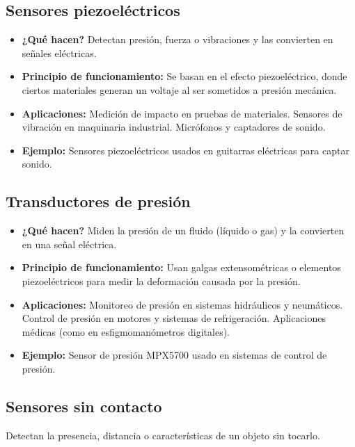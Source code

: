 \subsection*{Sensores piezoeléctricos}
\begin{itemize}
	\item \textbf{¿Qué hacen?} Detectan presión, fuerza o vibraciones y las convierten en señales eléctricas.
	\item \textbf{Principio de funcionamiento:} Se basan en el efecto piezoeléctrico, donde ciertos materiales generan un voltaje al ser sometidos a presión mecánica.
	\item \textbf{Aplicaciones:} Medición de impacto en pruebas de materiales.
	Sensores de vibración en maquinaria industrial.
	Micrófonos y captadores de sonido.
	\item \textbf{Ejemplo:} Sensores piezoeléctricos usados en guitarras eléctricas para captar sonido.
\end{itemize}
\subsection*{Transductores de presión}
\begin{itemize}
	\item \textbf{¿Qué hacen?} Miden la presión de un fluido (líquido o gas) y la convierten en una señal eléctrica.
	\item \textbf{Principio de funcionamiento:} Usan galgas extensométricas o elementos piezoeléctricos para medir la deformación causada por la presión.
	\item \textbf{Aplicaciones:} Monitoreo de presión en sistemas hidráulicos y neumáticos.
	Control de presión en motores y sistemas de refrigeración.
	Aplicaciones médicas (como en esfigmomanómetros digitales).
	\item \textbf{Ejemplo:} Sensor de presión MPX5700 usado en sistemas de control de presión.
\end{itemize}
\subsection{Sensores sin contacto}
Detectan la presencia, distancia o características de un objeto sin tocarlo.
